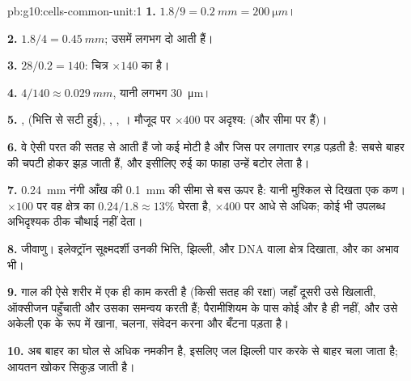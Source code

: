 \begin{solution}{pb:g10:cells-common-unit:1}
\textbf{1.} $1.8/9 = \qty{0.2}{mm} = \qty{200}{\micro m}$।

\textbf{2.} $1.8/4 = \qty{0.45}{mm}$; उसमें लगभग दो  आती हैं।

\textbf{3.} $28/0.2 = 140$: चित्र $\times 140$ का है।

\textbf{4.} $4/140 \approx \qty{0.029}{mm}$, यानी लगभग \qty{30}{\micro m}।

\textbf{5.} ,  (भित्ति से सटी हुई),
, , । मौजूद पर $\times 400$ पर अदृश्य:
 (और  सीमा पर हैं)।

\textbf{6.} वे ऐसी परत की सतह से आती हैं जो कई  मोटी है और जिस
पर लगातार रगड़ पड़ती है: सबसे बाहर की  चपटी होकर झड़ जाती हैं,
और इसीलिए रुई का फाहा उन्हें बटोर लेता है।

\textbf{7.} \qty{0.24}{mm} नंगी आँख की \qty{0.1}{mm} की सीमा से बस ऊपर
है: यानी मुश्किल से दिखता एक कण। $\times 100$ पर वह क्षेत्र का
$0.24/1.8 \approx 13\%$ घेरता है, $\times 400$ पर आधे से अधिक; कोई भी
उपलब्ध अभिदृश्यक ठीक चौथाई नहीं देता।

\textbf{8.} जीवाणु। इलेक्ट्रॉन सूक्ष्मदर्शी उनकी भित्ति, झिल्ली,
 और DNA वाला क्षेत्र दिखाता, और  का अभाव भी।

\textbf{9.} गाल की  ऐसे शरीर में एक ही काम करती है (किसी सतह की
रक्षा) जहाँ दूसरी  उसे खिलाती, ऑक्सीजन पहुँचाती और उसका समन्वय
करती हैं; पैरामीशियम के पास कोई और है ही नहीं, और उसे अकेली एक 
के रूप में खाना, चलना, संवेदन करना और बँटना पड़ता है।

\textbf{10.} अब बाहर का घोल  से अधिक नमकीन है, इसलिए जल
झिल्ली पार करके  से बाहर चला जाता है;  आयतन खोकर सिकुड़
जाती है।


\end{solution}
